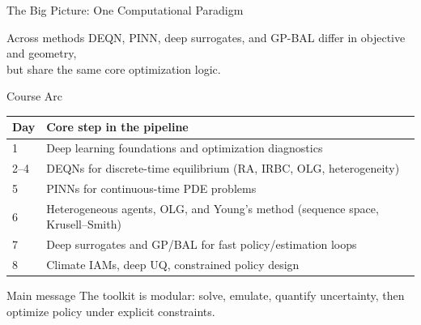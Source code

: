 \documentclass[aspectratio=169,11pt]{beamer}
\begin{document}
\begin{frame}{The Big Picture: One Computational Paradigm}
\begin{center}
\end{center}

\vspace{0.25cm}
\begin{block}{Across methods}
DEQN, PINN, deep surrogates, and GP-BAL differ in objective and geometry,\\
but share the same core optimization logic.
\end{block}
\end{frame}

\begin{frame}{Course Arc}
\small
\begin{center}
\begin{tabular}{ll}
\toprule
\textbf{Day} & \textbf{Core step in the pipeline} \\
\midrule
1 & Deep learning foundations and optimization diagnostics \\
2--4 & DEQNs for discrete-time equilibrium (RA, IRBC, OLG, heterogeneity) \\
5 & PINNs for continuous-time PDE problems \\
6 & Heterogeneous agents, OLG, and Young's method (sequence space, Krusell--Smith) \\
7 & Deep surrogates and GP/BAL for fast policy/estimation loops \\
8 & Climate IAMs, deep UQ, constrained policy design \\
\bottomrule
\end{tabular}
\end{center}

\vspace{0.2cm}
\begin{alertblock}{Main message}
The toolkit is modular: solve, emulate, quantify uncertainty, then optimize policy under explicit constraints.
\end{alertblock}
\end{frame}
\end{document}
